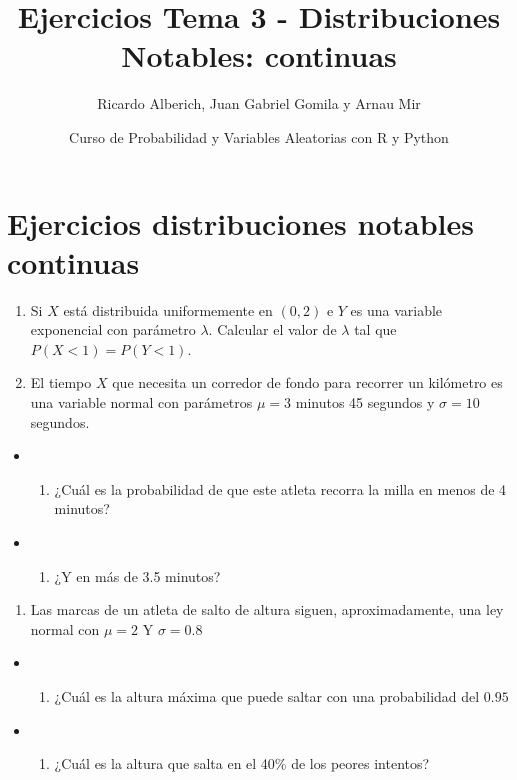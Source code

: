 \documentclass[
]{article}
\title{Ejercicios Tema 3 - Distribuciones Notables: continuas}
\author{Ricardo Alberich, Juan Gabriel Gomila y Arnau Mir}
\date{Curso de Probabilidad y Variables Aleatorias con R y Python}
\providecommand{\tightlist}{%
  \setlength{\itemsep}{0pt}\setlength{\parskip}{0pt}}
\begin{document}
\maketitle

\hypertarget{ejercicios-distribuciones-notables-continuas}{%
\section{Ejercicios distribuciones notables
continuas}\label{ejercicios-distribuciones-notables-continuas}}

\begin{enumerate}
\def\labelenumi{\arabic{enumi}.}
\item
  Si \(X\) está distribuida uniformemente en \((0,2)\) e \(Y\) es una
  variable exponencial con parámetro \(\lambda\). Calcular el valor de
  \(\lambda\) tal que \(P(X<1)=P(Y<1)\).
\item
  El tiempo \(X\) que necesita un corredor de fondo para recorrer un
  kilómetro es una variable normal con parámetros \(\mu =3\) minutos 45
  segundos y \(\sigma = 10\) segundos.
\end{enumerate}

\begin{itemize}
\item
  \begin{enumerate}
  \def\labelenumi{\alph{enumi})}
  \tightlist
  \item
    ¿Cuál es la probabilidad de que este atleta recorra la milla en
    menos de 4 minutos?\\
  \end{enumerate}
\item
  \begin{enumerate}
  \def\labelenumi{\alph{enumi})}
  \setcounter{enumi}{1}
  \tightlist
  \item
    ¿Y en más de 3.5 minutos?
  \end{enumerate}
\end{itemize}

\begin{enumerate}
\def\labelenumi{\arabic{enumi}.}
\setcounter{enumi}{2}
\tightlist
\item
  Las marcas de un atleta de salto de altura siguen, aproximadamente,
  una ley normal con \(\mu=2\) Y \(\sigma=0.8\)
\end{enumerate}

\begin{itemize}
\item
  \begin{enumerate}
  \def\labelenumi{\alph{enumi})}
  \tightlist
  \item
    ¿Cuál es la altura máxima que puede saltar con una probabilidad del
    \(0.95\)
  \end{enumerate}
\item
  \begin{enumerate}
  \def\labelenumi{\alph{enumi})}
  \setcounter{enumi}{1}
  \tightlist
  \item
    ¿Cuál es la altura que salta en el 40\% de los peores intentos?
  \end{enumerate}
\end{itemize}
\end{document}
